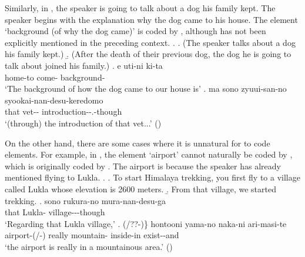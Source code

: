 Similarly, in \Next[c],
the speaker is going to talk about a dog his family kept.
The speaker begins with the explanation why the dog came to his house.
The element  `background (of why the dog came)' is coded by ,
although  has not been explicitly mentioned in the preceding context.
%
\ex.
 \a. (The speaker talks about a dog his family kept.)
 \b. (After the death of their previous dog, the dog he is going to talk about joined his family.)
 \bg. e uti-ni ki-ta  \\
 	 home-to come- background- \\
	`The background of how the dog came to our house is'
 \bg. ma sono zyuui-san-no syookai-nan-desu-keredomo \\
 	 that vet-- introduction--.-though \\
	`(through) the introduction of that vet...'
	\hfill{()}


On the other hand,
there are some cases where it is unnatural for  to code  elements.
For example, in \Next[c],
the element  `airport' cannot naturally be coded by ,
which is originally coded by .
The airport is  because the speaker has already mentioned flying to Lukla.
\ex.
%
	\a. To start Himalaya trekking, you first fly to a village called Lukla whose elevation is 2600 meters.
	\b. From that village, we started trekking.
	\bg. sono rukura-no mura-nan-desu-ga \\
		that Lukla- village---though \\
		`Regarding that Lukla village,'
	\bg. (/??-)\} hontooni yama-no naka-ni ari-masi-te \\
		airport-(/-) really mountain- inside-in exist--and \\
		`the airport is really in a mountainous area.'
	\hfill{()}

